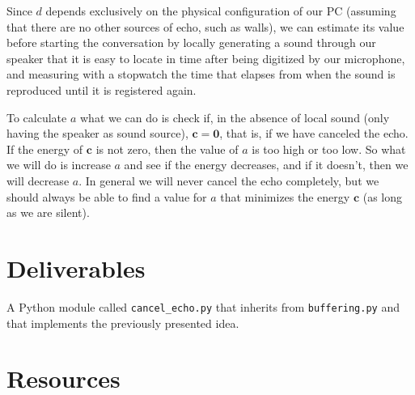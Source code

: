 Since $d$ depends exclusively on the physical configuration of our PC
(assuming that there are no other sources of echo, such as walls), we
can estimate its value before starting the conversation by locally
generating a sound through our speaker that it is easy to locate in
time after being digitized by our microphone, and measuring with a
stopwatch the time that elapses from when the sound is reproduced
until it is registered again.

To calculate $a$ what we can do is check if, in the absence of local
sound (only having the speaker as sound source),
${\mathbf c}={\mathbf 0}$, that is, if we have canceled the echo. If
the energy of ${\mathbf c}$ is not zero, then the value of $a$ is too
high or too low. So what we will do is increase $a$ and see if the
energy decreases, and if it doesn't, then we will decrease $a$. In
general we will never cancel the echo completely, but we should always
be able to find a value for $a$ that minimizes the energy
${\mathbf c}$ (as long as we are silent).

\section{Deliverables}

A Python module called \texttt{cancel_echo.py} that inherits from
\texttt{buffering.py} and that implements the previously presented
idea.

\section{Resources}


